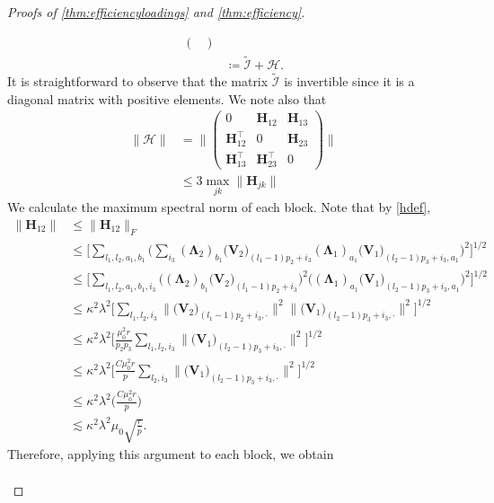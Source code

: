 \documentclass[10pt]{article}
\newcommand{\0}{{\mathbf{0}}}
\newcommand{\1}{{\mathbf{1}}}
\renewcommand{\t}{^{\top}}
\renewcommand{\tilde}{\widetilde}
\begin{document}
\begin{proof}[Proofs of \cref{thm:efficiencyloadings} and \cref{thm:efficiency}]
\begin{itemize}
\begin{align*}
\begin{pmatrix}
    \end{pmatrix} \\
    &\coloneqq \mathcal{\tilde I} + \mathcal{H}.
\end{align*}
It is straightforward to observe that the matrix $ \mathcal{\tilde I}$ is invertible since it is a diagonal matrix with positive elements.  We note also that
\begin{align*}
\| \mathcal{H} \|&= \Bigg\| \begin{pmatrix} 0 & \mathbf{H}_{12} & \mathbf{H}_{13} \\ \mathbf{H}_{12}\t & 0 & \mathbf{H}_{23} \\ \mathbf{H}_{13}\t & \mathbf{H}_{23}\t & 0
    \end{pmatrix}\Bigg\| \\
    &\leq 3 \max_{jk} \| \mathbf{H}_{jk} \|
\end{align*}
We calculate the maximum spectral norm of each block.  Note that by \eqref{hdef},
\begin{align*}
\|    \mathbf{H}_{12}  \| &\leq \| \mathbf{H}_{12} \|_F \\
&\leq \Bigg[ \sum_{l_1,l_2,a_1,b_1} \bigg( \sum_{i_3}(\mathbf{\Lambda}_2)_{b_1} \big( \mathbf{V}_2 \big)_{(l_1 - 1)p_2 + i_3}(\mathbf{\Lambda}_1)_{a_1} \big( \mathbf{V}_1\big)_{(l_2-1)p_3 + i_3, a_1} \bigg)^2 \Bigg]^{1/2} \\
&\leq \Bigg[ \sum_{l_1,l_2,a_1,b_1,i_3} \bigg( (\mathbf{\Lambda}_2)_{b_1} \big( \mathbf{V}_2 \big)_{(l_1 - 1)p_2 + i_3} \bigg)^2 \bigg( (\mathbf{\Lambda}_1)_{a_1} \big( \mathbf{V}_1\big)_{(l_2-1)p_3 + i_3, a_1}  \bigg)^2 \Bigg]^{1/2} \\
&\leq \kappa^2 \lambda^2 \Bigg[ \sum_{l_1,l_2,i_3} \| \big( \mathbf{V}_2 \big)_{(l_1 - 1)p_2 + i_3,\cdot} \|^2 \| \big( \mathbf{V}_1\big)_{(l_2-1)p_3 + i_3, \cdot} \|^2 \Bigg]^{1/2} \\
&\leq \kappa^2 \lambda^2 \Bigg[ \frac{\mu_0^2 r}{p_2p_3} \sum_{l_1,l_2,i_3}  \| \big( \mathbf{V}_1\big)_{(l_2-1)p_3 + i_3, \cdot} \|^2 \Bigg]^{1/2} \\
&\leq \kappa^2 \lambda^2 \Bigg[ \frac{C \mu_0^2 r}{p} \sum_{l_2,i_3}\| \big( \mathbf{V}_1\big)_{(l_2-1)p_3 + i_3, \cdot} \|^2  \Bigg]^{1/2} \\
&\leq \kappa^2 \lambda^2 \big( \frac{C \mu_0^2 r}{p} \big) \\
&\lesssim \kappa^2 \lambda^2 \mu_0 \sqrt{\frac{r}{p}}.
\end{align*}
Therefore, applying this argument to each block, we obtain
\begin{align*}

\end{align*}
\end{itemize}
\end{proof}
\end{document}
